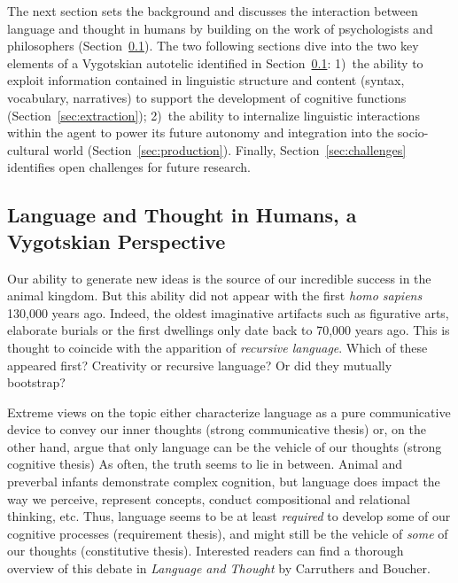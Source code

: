 The next section sets the background and discusses the interaction between language and thought in humans by building on the work of psychologists and philosophers (Section~\ref{sec:4views}). The two following sections dive into the two key elements of a Vygotskian autotelic \ai identified in Section~\ref{sec:4views}: 1)~the ability to exploit information contained in linguistic structure and content (syntax, vocabulary, narratives) to support the development of cognitive functions (Section~\ref{sec:extraction}); 2)~the ability to internalize linguistic interactions within the agent to power its future autonomy and integration into the socio-cultural world (Section~\ref{sec:production}). Finally, Section~\ref{sec:challenges} identifies open challenges for future research.



\subsection{Language and Thought in Humans, a Vygotskian Perspective}
\label{sec:4views}
Our ability to generate new ideas is the source of our incredible success in the animal kingdom. But this ability did not appear with the first \textit{homo sapiens} 130,000 years ago. Indeed, the oldest imaginative artifacts such as figurative arts, elaborate burials or the first dwellings only date back to 70,000 years ago.\cite{harari_sapiens_2014, vyshedskiy_language_2019} This is thought to coincide with the apparition of \textit{recursive language}.\cite{goldberg1999emergence, vyshedskiy_language_2019, hoffmann_construction_2020} Which of these appeared first? Creativity or recursive language? Or did they mutually bootstrap?

Extreme views on the topic either characterize language as a pure communicative device to convey our inner thoughts (strong communicative thesis)\cite{chomsky_syntactic_1957,fodor1975language} or, on the other hand, argue that only language can be the vehicle of our thoughts (strong cognitive thesis)\cite{wittgenstein1953philosophical, mcdowell1996mind} As often, the truth seems to lie in between. Animal and preverbal infants demonstrate complex cognition,\cite{sperber1995causal, allen1999species} but language does impact the way we perceive,\cite{waxman_words_1995, yoshida_sound_2003} represent concepts,\cite{lakoff2008metaphors} conduct compositional and relational thinking,\cite{gentner2002relational, gentner_analogy_2017, vyshedskiy_language_2019} etc. Thus, language seems to be at least \textit{required} to develop some of our cognitive processes (requirement thesis), and might still be the vehicle of \textit{some} of our thoughts (constitutive thesis).\cite{carruthers_language_1998} Interested readers can find a thorough overview of this debate in \textit{Language and Thought} by Carruthers and Boucher.\cite{carruthers_language_1998}

